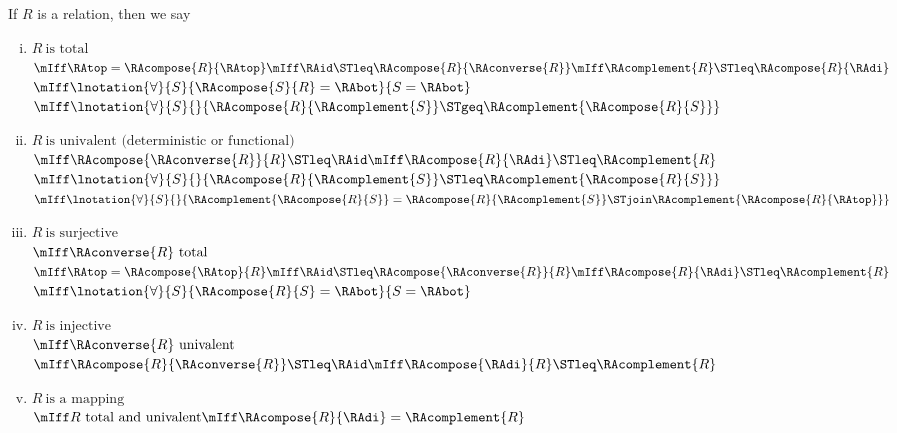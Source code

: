 \begin{definition}
\label{def:relationtypes}	
	If $R$ is a relation, then we say
	\begin{enumerate}[(i)]
		\item $R\ \text{is total}$ \\ 
			  $\mIff \RAtop = \RAcompose{R}{\RAtop} 
			   \mIff \RAid \STleq \RAcompose{R}{\RAconverse{R}} 
			   \mIff \RAcomplement{R} \STleq \RAcompose{R}{\RAdi}$ \\
			  $\mIff \lnotation{\forall}{S}{\RAcompose{S}{R} = \RAbot}{S = \RAbot}$ \\
			  $\mIff \lnotation{\forall}{S}{}{\RAcompose{R}{\RAcomplement{S}} \STgeq \RAcomplement{\RAcompose{R}{S}}}$
		\item $R\ \text{is univalent (deterministic or functional)}$ \\ 
			  $\mIff \RAcompose{\RAconverse{R}}{R} \STleq \RAid 
			   \mIff \RAcompose{R}{\RAdi} \STleq \RAcomplement{R}$\\
			  $\mIff \lnotation{\forall}{S}{}{\RAcompose{R}{\RAcomplement{S}} \STleq \RAcomplement{\RAcompose{R}{S}}}$ \\
			  $\mIff \lnotation{\forall}{S}{}{\RAcomplement{\RAcompose{R}{S}} = \RAcompose{R}{\RAcomplement{S}} \STjoin \RAcomplement{\RAcompose{R}{\RAtop}}}$
		\item $R\ \text{is surjective}$ \\ 
			  $\mIff \RAconverse{R}\ \text{total}$ \\  
			  $\mIff \RAtop = \RAcompose{\RAtop}{R}
			   \mIff \RAid \STleq \RAcompose{\RAconverse{R}} {R}
			   \mIff \RAcompose{R}{\RAdi} \STleq \RAcomplement{R}$ \\
			  $\mIff \lnotation{\forall}{S}{\RAcompose{R}{S} = \RAbot}{S = \RAbot}$ 
		\item $R\ \text{is injective}$ \\ 
			  $\mIff \RAconverse{R}\ \text{univalent}$ \\   
			  $\mIff \RAcompose{R}{\RAconverse{R}} \STleq \RAid 
			   \mIff \RAcompose{\RAdi}{R} \STleq \RAcomplement{R}$
		\item $R\ \text{is a mapping}$ \\ 
			  $\mIff R\ \text{total and univalent} 
			   \mIff \RAcompose{R}{\RAdi} = \RAcomplement{R}$ \\

\end{enumerate}
\end{definition}
